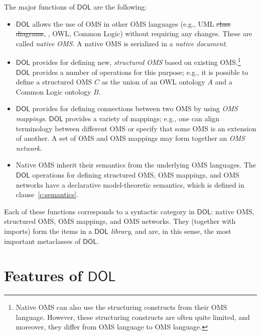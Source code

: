 \documentclass[10pt,fleqn,final]{scrreprt}
\newcommand*{\DOL}{\ensuremath{\mathsf{DOL}}\xspace}
\newcommand{\clauserefname}{clause}
\newcommand{\cref}[1]{\clauserefname~\ref{#1}}
\providecommand{\DIFadd}[1]{{\protect\color{blue}\uwave{#1}}} %
\providecommand{\DIFdel}[1]{{\protect\color{red}\sout{#1}}}                      %
\providecommand{\DIFaddbegin}{} %
\providecommand{\DIFaddend}{} %
\providecommand{\DIFdelbegin}{} %
\providecommand{\DIFdelend}{} %
\begin{document}
The major functions of \DOL are the following: 
\begin{itemize}
		\item \DOL allows the use of OMS in other OMS languages (e.g., UML \DIFdelbegin \DIFdel{class diagrams}\DIFdelend \DIFaddbegin \DIFadd{models}\DIFaddend , \CASL, 
		OWL, Common Logic) without requiring any changes. These are called \emph{native OMS}.  A native OMS is serialized in a \emph{native document}.   
		\item \DOL provides for defining new, \emph{structured OMS} based on existing OMS.\footnote{Native OMS can also use the structuring constructs from their OMS language. However, these structuring constructs are often quite limited, and moreover, they differ from OMS language to OMS language.} \DOL provides a number of operations for this purpose; e.g.,
		it is possible to define a structured OMS $C$ as the union of an OWL
		ontology $A$ and a Common Logic ontology $B$.
		\item \DOL provides for defining connections between two OMS by using 
		\emph{OMS mappings}. \DOL provides a variety of mappings; e.g.,  one can align terminology 
		between different OMS or specify that some OMS is an extension of another. A set of OMS
		and OMS mappings may form together an \emph{OMS network}.
		\item Native OMS inherit their semantics from the underlying OMS languages. The \DOL
		 operations for defining structured OMS, 
		OMS mappings, and OMS networks have a declarative model-theoretic semantics, which is 
		 defined in \cref{c:semantics}.  
\end{itemize}

 Each of these functions corresponds to a syntactic category in \DOL: native OMS, structured
 OMS, OMS mappings, and OMS networks. They (together with imports) form the items in a
\emph{\DOL library}, and are, in this sense, the most important metaclasses of \DOL. 


 





\section{Features of \DOL}\label{c:req:overview}
\end{document}
